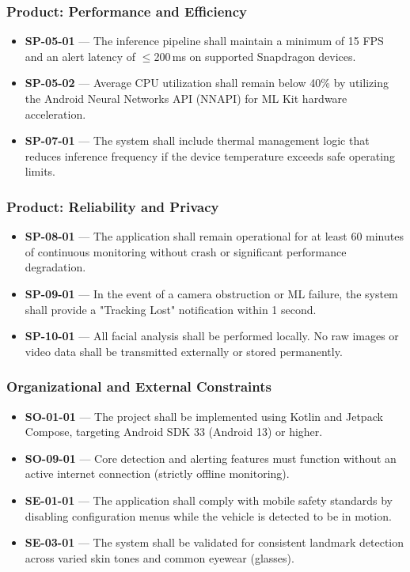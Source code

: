 \documentclass[11pt]{report}
\begin{document}
\subsubsection{Product: Performance and Efficiency}
\begin{itemize}
    \item \textbf{SP-05-01} — The inference pipeline shall maintain a minimum of 15 FPS and an alert latency of $\leq$200\,ms on supported Snapdragon devices.
    \item \textbf{SP-05-02} — Average CPU utilization shall remain below 40\% by utilizing the Android Neural Networks API (NNAPI) for ML Kit hardware acceleration.
    \item \textbf{SP-07-01} — The system shall include thermal management logic that reduces inference frequency if the device temperature exceeds safe operating limits.
\end{itemize}

\subsubsection{Product: Reliability and Privacy}
\begin{itemize}
    \item \textbf{SP-08-01} — The application shall remain operational for at least 60 minutes of continuous monitoring without crash or significant performance degradation.
    \item \textbf{SP-09-01} — In the event of a camera obstruction or ML failure, the system shall provide a "Tracking Lost" notification within 1 second.
    \item \textbf{SP-10-01} — All facial analysis shall be performed locally. No raw images or video data shall be transmitted externally or stored permanently.
\end{itemize}

\subsubsection{Organizational and External Constraints}
\begin{itemize}
    \item \textbf{SO-01-01} — The project shall be implemented using Kotlin and Jetpack Compose, targeting Android SDK 33 (Android 13) or higher.
    \item \textbf{SO-09-01} — Core detection and alerting features must function without an active internet connection (strictly offline monitoring).
    \item \textbf{SE-01-01} — The application shall comply with mobile safety standards by disabling configuration menus while the vehicle is detected to be in motion.
    \item \textbf{SE-03-01} — The system shall be validated for consistent landmark detection across varied skin tones and common eyewear (glasses).
\end{itemize}
\end{document}
